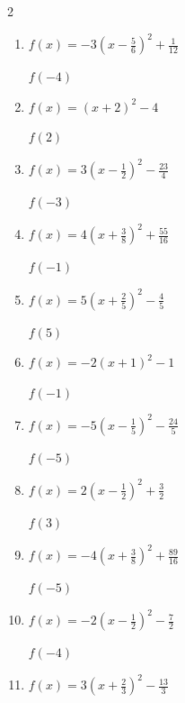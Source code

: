 \begin{multicols}{2}
\begin{enumerate}
$f(-3)$
        \phantom{$=6$}

  \item $\displaystyle f(x)=-3\left( x-\frac{5}{6}\right)^{2}+\frac{1}{12}$

$f(-4)$
        \phantom{$=-70$}

  \item $\displaystyle f(x)=\left( x+2\right)^{2}-4$

$f(2)$
        \phantom{$=12$}

  \item $\displaystyle f(x)=3\left( x-\frac{1}{2}\right)^{2}-\frac{23}{4}$

$f(-3)$
        \phantom{$=31$}

\columnbreak %

  \item $\displaystyle f(x)=4\left( x+\frac{3}{8}\right)^{2}+\frac{55}{16}$

$f(-1)$
        \phantom{$=5$}

  \item $\displaystyle f(x)=5\left( x+\frac{2}{5}\right)^{2}-\frac{4}{5}$

$f(5)$
        \phantom{$=145$}

  \item $\displaystyle f(x)=-2\left( x+1\right)^{2}-1$

$f(-1)$
        \phantom{$=-1$}

  \item $\displaystyle f(x)=-5\left( x-\frac{1}{5}\right)^{2}-\frac{24}{5}$

$f(-5)$
        \phantom{$=-140$}

  \item $\displaystyle f(x)=2\left( x-\frac{1}{2}\right)^{2}+\frac{3}{2}$

$f(3)$
        \phantom{$=14$}

\columnbreak %

\resetques

  \item $\displaystyle f(x)=-4\left( x+\frac{3}{8}\right)^{2}+\frac{89}{16}$

$f(-5)$
        \phantom{$=-80$}

  \item $\displaystyle f(x)=-2\left( x-\frac{1}{2}\right)^{2}-\frac{7}{2}$

$f(-4)$
        \phantom{$=-44$}

  \item $\displaystyle f(x)=3\left( x+\frac{2}{3}\right)^{2}-\frac{13}{3}$


\end{enumerate}
\end{multicols}
